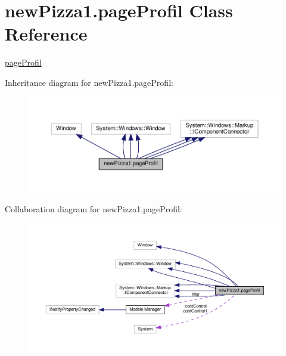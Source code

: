 \hypertarget{classnewPizza1_1_1pageProfil}{}\section{new\+Pizza1.\+page\+Profil Class Reference}
\label{classnewPizza1_1_1pageProfil}


\hyperlink{classnewPizza1_1_1pageProfil}{page\+Profil}  




Inheritance diagram for new\+Pizza1.\+page\+Profil\+:
\nopagebreak
\begin{figure}[H]
\begin{center}
\leavevmode
\includegraphics[width=350pt]{classnewPizza1_1_1pageProfil__inherit__graph}
\end{center}
\end{figure}


Collaboration diagram for new\+Pizza1.\+page\+Profil\+:
\nopagebreak
\begin{figure}[H]
\begin{center}
\leavevmode
\includegraphics[width=350pt]{classnewPizza1_1_1pageProfil__coll__graph}
\end{center}
\end{figure}
